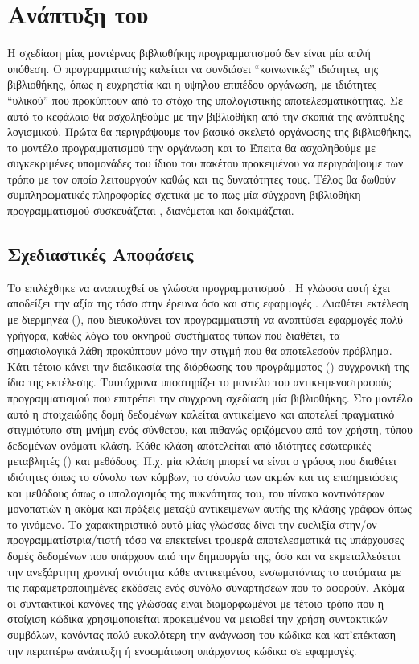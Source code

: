 \chapter{Ανάπτυξη του }
\label{chap3}
Η σχεδίαση μίας μοντέρνας βιβλιοθήκης προγραμματισμού δεν είναι μία απλή υπόθεση.
Ο προγραμματιστής καλείται να συνδιάσει ``κοινωνικές'' ιδιότητες της βιβλιοθήκης, όπως η ευχρηστία και η υψηλου επιπέδου οργάνωση, με ιδιότητες ``υλικού'' που προκύπτουν από το στόχο της υπολογιστικής αποτελεσματικότητας.
Σε αυτό το κεφάλαιο θα ασχοληθούμε με την βιβλιοθήκη από την σκοπιά της ανάπτυξης λογισμικού.
Πρώτα θα περιγράψουμε τον βασικό σκελετό οργάνωσης της βιβλιοθήκης, το μοντέλο προγραμματισμού την οργάνωση και το 
Έπειτα θα ασχοληθούμε με συγκεκριμένες υπομονάδες του ίδιου του πακέτου προκειμένου να περιγράψουμε των τρόπο με τον οποίο λειτουργούν καθώς και τις δυνατότητες τους.
Τέλος θα δωθούν συμπληρωματικές πληροφορίες σχετικά με το πως μία σύγχρονη βιβλιοθήκη προγραμματισμού συσκευάζεται , διανέμεται και δοκιμάζεται.
\section{Σχεδιαστικές Αποφάσεις}
Το  επιλέχθηκε να αναπτυχθεί σε γλώσσα προγραμματισμού .
Η γλώσσα αυτή έχει αποδείξει την αξία της τόσο στην έρευνα όσο και στις εφαρμογές \cite{PythonHype}.
Διαθέτει εκτέλεση με διερμηνέα (), που διευκολύνει τον προγραμματιστή να αναπτύσει εφαρμογές πολύ γρήγορα, καθώς λόγω του οκνηρού συστήματος τύπων που διαθέτει, τα σημασιολογικά λάθη προκύπτουν μόνο την στιγμή που θα αποτελεσούν πρόβλημα.
Κάτι τέτοιο κάνει την διαδικασία της διόρθωσης του προγράμματος () συγχρονική της ίδια της εκτέλεσης.
Ταυτόχρονα υποστηρίζει το μοντέλο του αντικειμενοστραφούς προγραμματισμού που επιτρέπει την συγχρονη σχεδίαση μία βιβλιοθήκης.
Στο μοντέλο αυτό η στοιχειώδης δομή δεδομένων καλείται αντικείμενο και αποτελεί πραγματικό στιγμιότυπο στη μνήμη ενός σύνθετου, και πιθανώς οριζόμενου από τον χρήστη, τύπου δεδομένων ονόματι κλάση.
Κάθε κλάση απότελείται από ιδιότητες εσωτερικές μεταβλητές () και μεθόδους.
Π.χ. μία κλάση μπορεί να είναι ο γράφος που διαθέτει ιδιότητες όπως το σύνολο των κόμβων, το σύνολο των ακμών και τις επισημειώσεις και μεθόδους όπως ο υπολογισμός της πυκνότητας του, του πίνακα κοντινότερων μονοπατιών ή ακόμα και πράξεις μεταξύ αντικειμένων αυτής της κλάσης γράφων όπως το γινόμενο.
Το χαρακτηριστικό αυτό μίας γλώσσας δίνει την ευελιξία στην/ον προγραμματίστρια/τιστή τόσο να επεκτείνει τρομερά αποτελεσματικά τις υπάρχουσες δομές δεδομένων που υπάρχουν από την δημιουργία της, όσο και να εκμεταλλεύεται την ανεξάρτητη χρονική οντότητα κάθε αντικειμένου, ενσωματόντας το αυτόματα με τις παραμετροποιημένες εκδόσεις ενός συνόλο συναρτήσεων που το αφορούν.
Ακόμα οι συντακτικοί κανόνες της γλώσσας είναι διαμορφωμένοι με τέτοιο τρόπο που η στοίχιση κώδικα χρησιμοποιείται προκειμένου να μειωθεί την χρήση συντακτικών συμβόλων, κανόντας πολύ ευκολότερη την ανάγνωση του κώδικα και κατ'επέκταση την περαιτέρω ανάπτυξη ή ενσωμάτωση υπάρχοντος κώδικα σε εφαρμογές.

